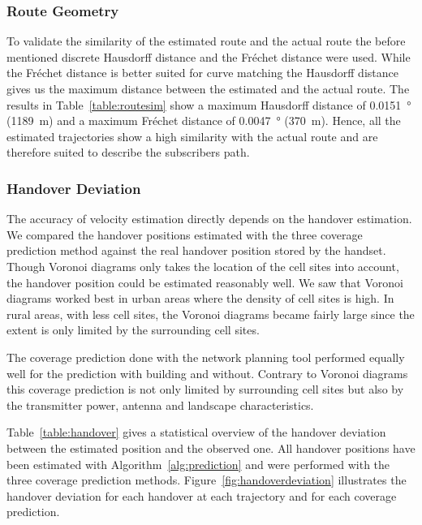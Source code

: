 \documentclass[twocolumn]{bmcart}%
\begin{document}
\subsubsection*{Route Geometry}
To validate the similarity of the estimated route and the actual route the before mentioned discrete Hausdorff distance and the Fr\'{e}chet distance were used. While the Fr\'{e}chet distance is better suited for curve matching the Hausdorff distance gives us the maximum distance between the estimated and the actual route. The results in Table~\ref{table:routesim} show a maximum Hausdorff distance of \SI{0.0151}{\degree} (\SI{1189}{\meter}) and a maximum Fr\'{e}chet distance of \SI{0.0047}{\degree} (\SI{370}{\meter}). Hence, all the estimated trajectories show a high similarity with the actual route and are therefore suited to describe the subscribers path.
\subsubsection*{Handover Deviation}
The accuracy of velocity estimation directly depends on the handover estimation. We compared the handover positions estimated with the three coverage prediction method against the real handover position stored by the handset. Though Voronoi diagrams only takes the location of the cell sites into account, the handover position could be estimated reasonably well. We saw that Voronoi diagrams worked best in urban areas where the density of cell sites is high. In rural areas, with less cell sites, the Voronoi diagrams became fairly large since the extent is only limited by the surrounding cell sites. 

The coverage prediction done with the network planning tool performed equally well for the prediction with building and without. Contrary to Voronoi diagrams this coverage prediction is not only limited by surrounding cell sites but also by the transmitter power, antenna and landscape characteristics.

Table~\ref{table:handover} gives a statistical overview of the handover deviation between the estimated position and the observed one. All handover positions have been estimated with Algorithm~\ref{alg:prediction} and were performed with the three coverage prediction methods. Figure~\ref{fig:handoverdeviation} illustrates the handover deviation for each handover at each trajectory and for each coverage prediction.
\end{document}
